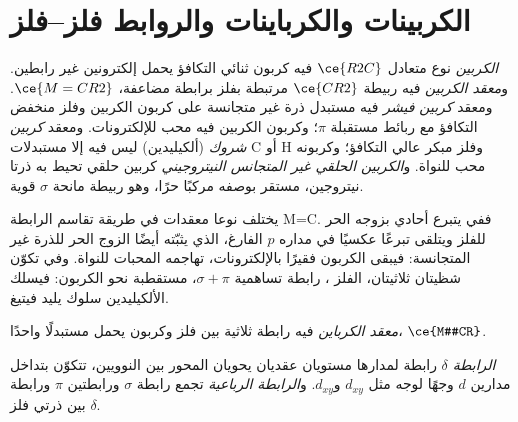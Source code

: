 \section{الكربينات والكرباينات والروابط فلز--فلز}

\begin{definition}\label{def:b3:organometallic-bonding:carbene}
\emph{الكربين} نوع متعادل $\ce{R2C}$ فيه كربون ثنائي التكافؤ
يحمل إلكترونين غير رابطين. و\emph{معقد الكربين}
فيه ربيطة $\ce{CR2}$ مرتبطة بفلز برابطة مضاعفة، $\ce{M=CR2}$. 
ومعقد \emph{كربين فيشر} فيه مستبدل ذرة غير متجانسة
على كربون الكربين وفلز منخفض التكافؤ مع ربائط مستقبلة $\pi$؛ وكربون الكربين فيه
محب للإلكترونات. ومعقد \emph{كربين شروك} (ألكيليدين)
ليس فيه إلا مستبدلات C أو H وفلز مبكر عالي التكافؤ؛ وكربونه
محب للنواة. و\emph{الكربين الحلقي غير المتجانس النيتروجيني}
كربين حلقي تحيط به ذرتا نيتروجين، مستقر بوصفه مركبًا حرًا، وهو ربيطة
مانحة $\sigma$ قوية.
\end{definition}

يختلف نوعا معقدات  في طريقة تقاسم الرابطة M=C.
ففي  يتبرع  أحادي بزوجه الحر للفلز 
ويتلقى تبرعًا عكسيًا في مداره $p$ الفارغ، الذي يثبّته أيضًا الزوج الحر للذرة غير
المتجانسة: فيبقى الكربون فقيرًا بالإلكترونات، تهاجمه المحبات للنواة. وفي
 تكوّن شظيتان ثلاثيتان، الفلز ، رابطة تساهمية $\sigma +
\pi$، مستقطبة نحو الكربون: فيسلك الألكيليدين سلوك يليد فيتيغ.

\begin{definition}\label{def:b3:organometallic-bonding:carbyne}
\emph{معقد الكرباين} فيه رابطة ثلاثية بين فلز
وكربون يحمل مستبدلًا واحدًا، $\ce{M#CR}$.
\end{definition}

\begin{definition}\label{def:b3:organometallic-bonding:delta}
\emph{الرابطة $\delta$} رابطة لمدارها مستويان عقديان
يحويان المحور بين النوويين، تتكوّن بتداخل مدارين $d$ وجهًا لوجه
مثل $d_{xy}$ و$d_{xy}$. و\emph{الرابطة الرباعية}
تجمع رابطة $\sigma$ ورابطتين $\pi$ ورابطة $\delta$ بين ذرتي فلز.
\end{definition}

